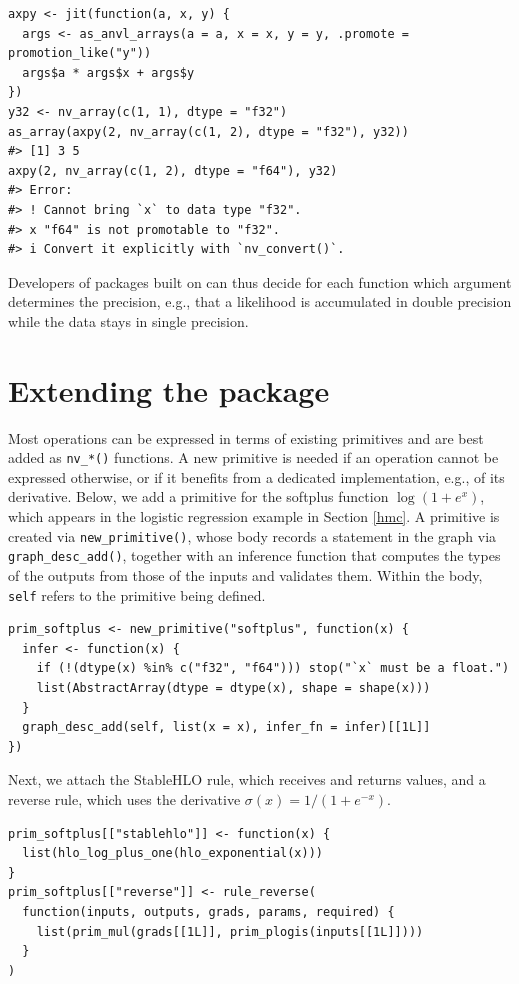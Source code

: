 \begin{verbatim}
axpy <- jit(function(a, x, y) {
  args <- as_anvl_arrays(a = a, x = x, y = y, .promote = promotion_like("y"))
  args$a * args$x + args$y
})
y32 <- nv_array(c(1, 1), dtype = "f32")
as_array(axpy(2, nv_array(c(1, 2), dtype = "f32"), y32))
#> [1] 3 5
axpy(2, nv_array(c(1, 2), dtype = "f64"), y32)
#> Error:
#> ! Cannot bring `x` to data type "f32".
#> x "f64" is not promotable to "f32".
#> i Convert it explicitly with `nv_convert()`.
\end{verbatim}

Developers of packages built on  can thus decide for each function which argument determines the precision, e.g., that a likelihood is accumulated in double precision while the data stays in single precision.

\section{Extending the package}\label{extending}

Most operations can be expressed in terms of existing primitives and are best added as \texttt{nv\_*()} functions.
A new primitive is needed if an operation cannot be expressed otherwise, or if it benefits from a dedicated implementation, e.g., of its derivative.
Below, we add a primitive for the softplus function \(\log(1 + e^x)\), which appears in the logistic regression example in Section \ref{hmc}.
A primitive is created via \texttt{new\_primitive()}, whose body records a statement in the graph via \texttt{graph\_desc\_add()}, together with an inference function that computes the types of the outputs from those of the inputs and validates them.
Within the body, \texttt{self} refers to the primitive being defined.

\begin{verbatim}
prim_softplus <- new_primitive("softplus", function(x) {
  infer <- function(x) {
    if (!(dtype(x) %in% c("f32", "f64"))) stop("`x` must be a float.")
    list(AbstractArray(dtype = dtype(x), shape = shape(x)))
  }
  graph_desc_add(self, list(x = x), infer_fn = infer)[[1L]]
})
\end{verbatim}

Next, we attach the StableHLO rule, which receives and returns  values, and a reverse rule, which uses the derivative \(\sigma(x) = 1 / (1 + e^{-x})\).

\begin{verbatim}
prim_softplus[["stablehlo"]] <- function(x) {
  list(hlo_log_plus_one(hlo_exponential(x)))
}
prim_softplus[["reverse"]] <- rule_reverse(
  function(inputs, outputs, grads, params, required) {
    list(prim_mul(grads[[1L]], prim_plogis(inputs[[1L]])))
  }
)
\end{verbatim}

